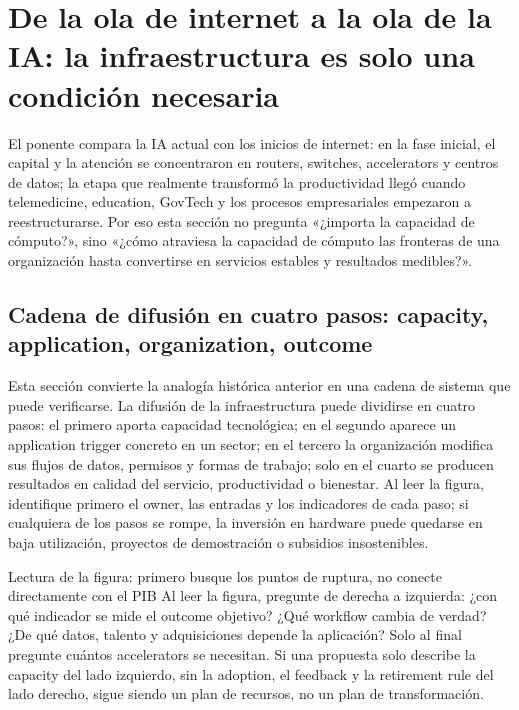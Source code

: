 \section{De la ola de internet a la ola de la IA: la infraestructura es solo una condición necesaria}

El ponente compara la IA actual con los inicios de internet: en la fase inicial, el capital y la atención se concentraron en routers, switches, accelerators y centros de datos; la etapa que realmente transformó la productividad llegó cuando telemedicine, education, GovTech y los procesos empresariales empezaron a reestructurarse. Por eso esta sección no pregunta «¿importa la capacidad de cómputo?», sino «¿cómo atraviesa la capacidad de cómputo las fronteras de una organización hasta convertirse en servicios estables y resultados medibles?».

\subsection{Cadena de difusión en cuatro pasos: capacity, application, organization, outcome}

Esta sección convierte la analogía histórica anterior en una cadena de sistema que puede verificarse. La difusión de la infraestructura puede dividirse en cuatro pasos: el primero aporta capacidad tecnológica; en el segundo aparece un application trigger concreto en un sector; en el tercero la organización modifica sus flujos de datos, permisos y formas de trabajo; solo en el cuarto se producen resultados en calidad del servicio, productividad o bienestar. Al leer la figura, identifique primero el owner, las entradas y los indicadores de cada paso; si cualquiera de los pasos se rompe, la inversión en hardware puede quedarse en baja utilización, proyectos de demostración o subsidios insostenibles.


\begin{knowledgebox}{Lectura de la figura: primero busque los puntos de ruptura, no conecte directamente con el PIB}
Al leer la figura, pregunte de derecha a izquierda: ¿con qué indicador se mide el outcome objetivo? ¿Qué workflow cambia de verdad? ¿De qué datos, talento y adquisiciones depende la aplicación? Solo al final pregunte cuántos accelerators se necesitan. Si una propuesta solo describe la capacity del lado izquierdo, sin la adoption, el feedback y la retirement rule del lado derecho, sigue siendo un plan de recursos, no un plan de transformación.
\end{knowledgebox}

